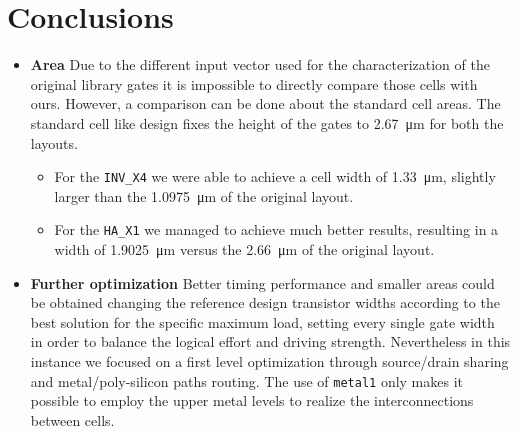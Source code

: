\documentclass[a4paper]{article}
\newcommand{\inv}{\texttt{INV\_X4}\xspace}
\newcommand{\ha}{\texttt{HA\_X1}\xspace}
\begin{document}
\section{Conclusions}
\begin{itemize}
	\item \textbf{Area} Due to the different input vector used for the characterization of the original library gates it is impossible to directly compare those cells with ours. However, a comparison can be done about the standard cell areas. The standard cell like design fixes the height of the gates to \SI{2.67}{\micro\meter} for both the layouts.
	\begin{itemize}
		\item For the \inv we were able to achieve a cell width of \SI{1.33}{\micro\meter}, slightly larger than the \SI{1.0975}{\micro\meter} of the original layout.

		\item For the \ha we managed to achieve much better results, resulting in a width of \SI{1.9025}{\micro\meter} versus the \SI{2.66}{\micro\meter} of the original layout.
	\end{itemize}

	\item \textbf{Further optimization} Better timing performance and smaller areas could be obtained changing the reference design transistor widths according to the best solution for the specific maximum load, setting every single gate width in order to balance the logical effort and driving strength. Nevertheless in this instance we focused on a first level optimization through source/drain sharing and metal/poly-silicon paths routing. The use of \texttt{metal1} only makes it possible to employ the upper metal levels to realize the interconnections between cells.
\end{itemize}
\end{document}

